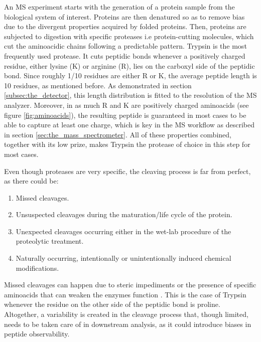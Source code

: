 An \ac{MS} experiment starts with the generation of a protein sample from the biological system of interest. Proteins are then denatured  so as to remove bias due to the divergent properties acquired by folded proteins. Then, proteins are subjected to digestion with specific proteases i.e protein-cutting molecules, which cut the aminoacidic chains following a predictable pattern. Trypsin is the most frequently used protease. It cuts peptidic bonds whenever a positively charged residue, either lysine (K) or arginine (R), lies on the carboxyl side of the peptidic bond. Since roughly 1/10 residues are either R or K, the average peptide length is 10 residues, as mentioned before. As demonstrated in section \ref{subsec:the_detector}, this length distribution is fitted to the resolution of the MS analyzer. Moreover, in as much R and K are positively charged aminoacids (see figure \ref{fig:aminoacids}), the resulting peptide is guaranteed in most cases to be able to capture at least one charge, which is key in the \ac{MS} workflow as described in section \ref{sec:the_mass_spectrometer}. All of these properties combined, together with its low prize, makes Trypsin the protease of choice in this step for most cases.

Even though proteases are very specific, the cleaving process is far from perfect, as there could be: \cite{Barsnes2008}

\begin{enumerate}

\item Missed cleavages.

\item Unsuspected cleavages during the maturation/life cycle of the protein.

\item Unexpected cleavages occurring either in the wet-lab procedure of the proteolytic treatment.

\item Naturally occurring, intentionally or unintentionally induced chemical modifications.

\end{enumerate}

Missed cleavages can happen due to steric impediments or the presence of specific aminoacids that can weaken the enzyme\textquotesingle s function \cite{Siepen2007}. This is the case of Trypsin whenever the residue on the other side of the peptidic bond is proline. Altogether, a variability is created in the cleavage process that, though limited, needs to be taken care of in downstream analysis, as it could introduce biases in peptide observability.

